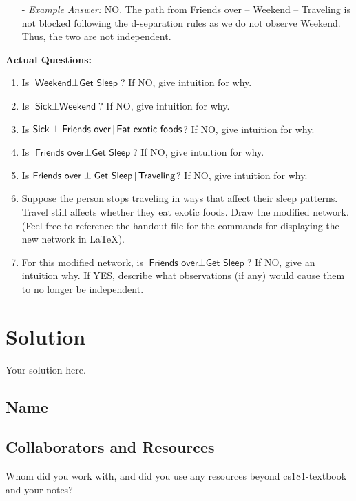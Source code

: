 \documentclass[submit]{../harvardml}
\newcommand{\attr}[1]{\textsf{#1}}
\newenvironment{solution}
  {\color{blue}\section*{Solution}}
{}
\begin{document}
\begin{problem}
\begin{itemize}
    \item[-] \textit{Example Answer:} NO. The path from Friends over -- Weekend -- Traveling is not blocked following the d-separation rules as we do not observe Weekend. Thus, the two are not independent. 
  \end{itemize}

  \noindent \textbf{Actual Questions:}

  \begin{enumerate}
    \item Is $\attr{Weekend} \perp \attr{Get Sleep}$?
      If NO, give intuition for why.

    \item Is $\attr{Sick} \perp \attr{Weekend}$?
      If NO, give intuition for why.

    \item Is $\attr{Sick} \perp \attr{Friends over}\given \attr{Eat exotic
      foods}$? If NO, give intuition for why.

    \item Is $\attr{Friends over} \perp \attr{Get Sleep}$? If NO, give
      intuition for why.

    \item Is $\attr{Friends over} \perp \attr{Get Sleep} \given
      \attr{Traveling}$? If NO, give intuition for why.

    \item Suppose the person stops traveling in ways that affect their
      sleep patterns.  Travel still
      affects whether they eat exotic foods.  Draw the modified network. (Feel free to reference the handout file for the commands for displaying the new network in \LaTeX).

    \item For this modified network, is $\attr{Friends over} \perp
      \attr{Get Sleep}$? If NO, give an intuition why.  If YES,
      describe what observations (if any) would cause them to no longer be
      independent.
  \end{enumerate}
\end{problem}

\begin{solution}
	Your solution here.
\end{solution}

\newpage


\subsection*{Name}

\subsection*{Collaborators and Resources}
Whom did you work with, and did you use any resources beyond cs181-textbook and your notes?
\end{document}
